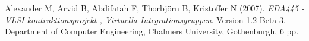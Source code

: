 \newpage
\begin{thebibliography}{99}

 Alexander M, Arvid B, Abdifatah F,
Thorbjörn B, Kristoffer N (2007). 
\emph{EDA445 - VLSI kontruktionsprojekt , Virtuella
Integrationsgruppen}. Version 1.2 Beta 3. Department of Computer
Engineering,
Chalmers University, Gothenburgh, 6 pp.












\end{thebibliography}
